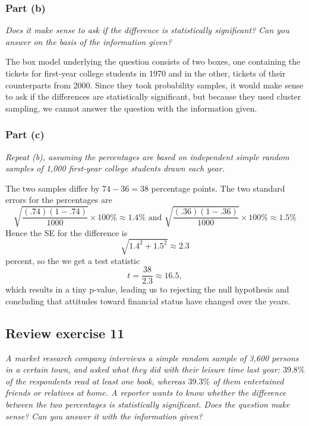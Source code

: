 \documentclass[11pt]{article}
\begin{document}
\subsubsection*{Part (b)}
\textit{Does it make sense to ask if the difference is statistically significant?
Can you answer on the basis of the information given?}

\vspace{5mm}

The box model underlying the question consists of two boxes, one containing the tickets for first-year college students in 1970 and in the other, tickets of their counterparts from 2000.  
Since they took probability samples, it would make sense to ask if the differences are statistically significant, but because they used cluster sampling, we cannot answer the question with the information given.

\subsubsection*{Part (c)}
\textit{Repeat (b), assuming the percentages are based on independent simple random samples of 1,000 first-year college students drawn each year.}

\vspace{5mm}

The two samples differ by $ 74-36=38 $ percentage points. 
The two standard errors for the percentages are $$ \sqrt{\frac{(.74)(1-.74)}{1000}} \times 100\% \approx 1.4\%  \text{ and } \sqrt{\frac{(.36)(1-.36)}{1000}} \times 100\%  \approx 1.5\% $$ 
Hence the SE for the difference is $$ \sqrt{1.4^2 + 1.5^2} \approx 2.3 $$ percent, so the we get a test statistic $$ t = \dfrac{38}{2.3} \approx 16.5, $$ which results in a tiny p-value, leading us to rejecting the null hypothesis and concluding that attitudes toward financial status have changed over the years.

\subsection*{Review exercise 11} %
\textit{A market research company interviews a simple random sample of 3,600 persons in a certain town, and asked what they did with their leisure time last year:
$ 39.8\% $ of the respondents read at least one book, whereas $ 39.3\% $ of them entertained friends or relatives at home.
A reporter wants to know whether the difference between the two percentages is statistically significant.
Does the question make sense?
Can you answer it with the information given?}
\end{document}
